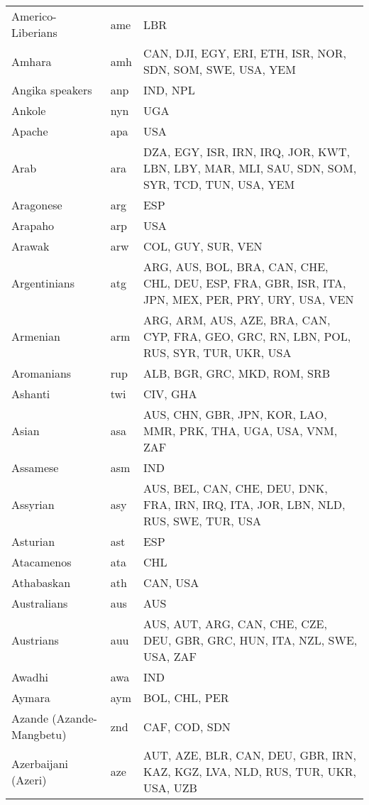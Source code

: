 \documentclass[12pt]{article}
\begin{document}
\begin{center}
\begin{longtable}{|p{7cm}|p{1cm}|p{7cm}|}
Americo-Liberians	&	ame	&	LBR	\\	\cline{1-3}
Amhara	&	amh 	&	CAN, DJI, EGY, ERI, ETH, ISR, NOR, SDN, SOM, SWE, USA, YEM	\\	\cline{1-3}
Angika speakers	&	anp 	&	IND, NPL	\\	\cline{1-3}
Ankole	&	nyn 	&	UGA	\\	\cline{1-3}
Apache	&	apa 	&	USA	\\	\cline{1-3}
Arab	&	ara 	&	DZA, EGY, ISR, IRN, IRQ, JOR, KWT, LBN, LBY, MAR, MLI, SAU, SDN, SOM, SYR, TCD, TUN, USA, YEM	 \\	\cline{1-3}
Aragonese	&	arg 	&	ESP	\\	\cline{1-3}
Arapaho	&	arp 	&	USA	\\	\cline{1-3}
Arawak	&	arw 	&	COL, GUY, SUR, VEN 	\\	\cline{1-3}
Argentinians	&	atg	&	ARG, AUS, BOL, BRA, CAN, CHE, CHL, DEU, ESP, FRA, GBR, ISR, ITA, JPN, MEX, PER, PRY, URY, USA, VEN	\\	\cline{1-3}
Armenian	&	arm	&	ARG, ARM, AUS, AZE, BRA, CAN, CYP, FRA, GEO, GRC, RN, LBN, POL, RUS, SYR, TUR, UKR, USA	\\	 \cline{1-3}
Aromanians	&	rup 	&	ALB, BGR, GRC, MKD, ROM, SRB	\\	\cline{1-3}
Ashanti	&	twi 	&	CIV, GHA	\\	\cline{1-3}
Asian	&	asa	&	AUS, CHN, GBR, JPN, KOR, LAO, MMR, PRK, THA, UGA, USA, VNM, ZAF	\\	\cline{1-3}
Assamese	&	asm 	&	IND	\\	\cline{1-3}
Assyrian	&	asy	&	AUS, BEL, CAN, CHE, DEU, DNK, FRA, IRN, IRQ, ITA, JOR, LBN, NLD, RUS, SWE, TUR, USA	\\	 \cline{1-3}
Asturian	&	ast 	&	ESP	\\	\cline{1-3}
Atacamenos	&	ata	&	CHL	\\	\cline{1-3}
Athabaskan	&	ath 	&	CAN, USA	\\	\cline{1-3}
Australians	&	aus 	&	AUS	\\	\cline{1-3}
Austrians	&	auu	&	AUS, AUT, ARG, CAN, CHE, CZE, DEU, GBR, GRC, HUN, ITA, NZL, SWE, USA, ZAF	\\	\cline{1-3}
Awadhi	&	awa 	&	IND	\\	\cline{1-3}
Aymara	&	aym 	&	BOL, CHL, PER	\\	\cline{1-3}
Azande (Azande-Mangbetu)	&	znd 	&	CAF, COD, SDN	\\	\cline{1-3}
Azerbaijani (Azeri)	&	aze 	&	AUT, AZE, BLR, CAN, DEU, GBR, IRN, KAZ, KGZ, LVA, NLD, RUS, TUR, UKR, USA, UZB	\\	 \cline{1-3}

\end{longtable}
\end{center}
\end{document}
